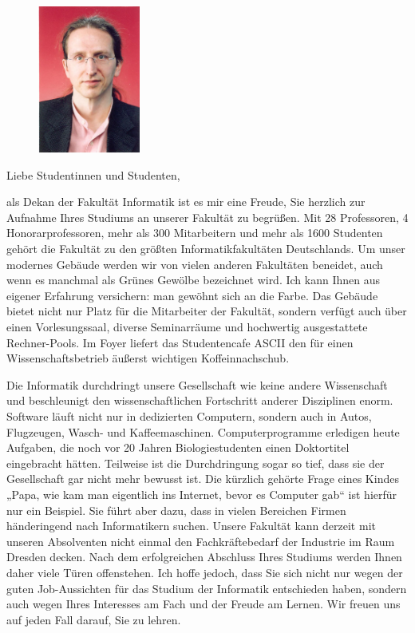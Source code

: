 
\begin{figure}
  \vspace{-15pt}
  \begin{centering}
    \includegraphics[width=0.3\textwidth]{img/franzbaader.jpg}
  \end{centering}
  \vspace{-20pt}
\end{figure}

Liebe Studentinnen und Studenten,

als Dekan der Fakultät Informatik ist es mir eine Freude, Sie herzlich zur Aufnahme Ihres Studiums an unserer Fakultät zu begrüßen. Mit 28 Professoren, 4 Honorarprofessoren, mehr als 300 Mitarbeitern und mehr als 1600 Studenten gehört die Fakultät zu den größten Informatikfakultäten Deutschlands. Um unser modernes Gebäude werden wir von vielen anderen Fakultäten beneidet, auch wenn es manchmal als Grünes Gewölbe bezeichnet wird. Ich kann Ihnen aus eigener Erfahrung versichern: man gewöhnt sich an die Farbe. Das Gebäude bietet nicht nur Platz für die Mitarbeiter der Fakultät, sondern verfügt auch über einen Vorlesungssaal, diverse Seminarräume und hochwertig ausgestattete Rechner-Pools. Im Foyer liefert das Studentencafe ASCII den für einen Wissenschaftsbetrieb äußerst wichtigen Koffeinnachschub.

Die Informatik durchdringt unsere Gesellschaft wie keine andere Wissenschaft und beschleunigt den wissenschaftlichen Fortschritt anderer Disziplinen enorm. Software läuft nicht nur in dedizierten Computern, sondern auch in Autos, Flugzeugen, Wasch- und Kaffeemaschinen. Computerprogramme erledigen heute Aufgaben, die noch vor 20 Jahren Biologiestudenten einen Doktortitel eingebracht hätten. Teilweise ist die Durchdringung sogar so tief, dass sie der Gesellschaft gar nicht mehr bewusst ist. Die kürzlich gehörte Frage eines Kindes „Papa, wie kam man eigentlich ins Internet, bevor es Computer gab“ ist hierfür nur ein Beispiel. Sie führt aber dazu, dass in vielen Bereichen Firmen händeringend nach Informatikern suchen. Unsere Fakultät kann derzeit mit unseren Absolventen nicht einmal den Fachkräftebedarf der Industrie im Raum Dresden decken. Nach dem erfolgreichen Abschluss Ihres Studiums werden Ihnen daher viele Türen offenstehen. Ich hoffe jedoch, dass Sie sich nicht nur wegen der guten Job-Aussichten für das Studium der Informatik entschieden haben, sondern auch wegen Ihres Interesses am Fach und der Freude am Lernen. Wir freuen uns auf jeden Fall darauf, Sie zu lehren.

